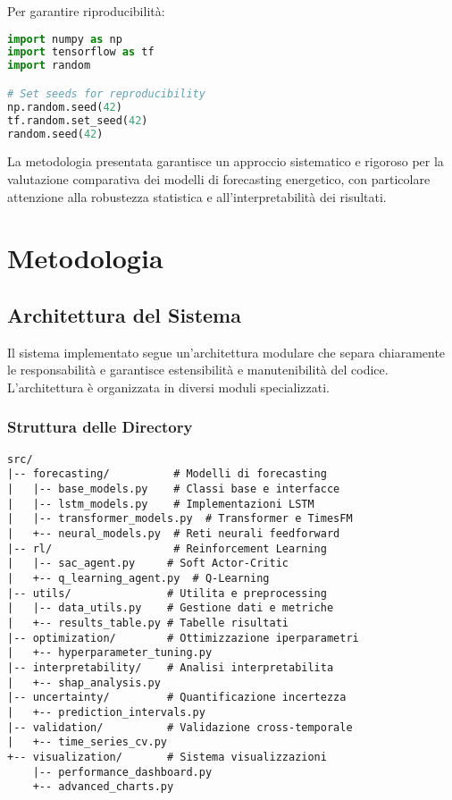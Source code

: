 \documentclass[12pt,a4paper,twoside]{report}
\begin{document}
Per garantire riproducibilità:

\begin{lstlisting}[language=Python]
import numpy as np
import tensorflow as tf
import random

# Set seeds for reproducibility
np.random.seed(42)
tf.random.set_seed(42)
random.seed(42)
\end{lstlisting}

La metodologia presentata garantisce un approccio sistematico e rigoroso per la valutazione comparativa dei modelli di forecasting energetico, con particolare attenzione alla robustezza statistica e all'interpretabilità dei risultati.


\chapter{Metodologia}

\section{Architettura del Sistema}

Il sistema implementato segue un'architettura modulare che separa chiaramente le responsabilità e garantisce estensibilità e manutenibilità del codice. L'architettura è organizzata in diversi moduli specializzati.

\subsection{Struttura delle Directory}

\begin{lstlisting}
src/
|-- forecasting/          # Modelli di forecasting
|   |-- base_models.py    # Classi base e interfacce
|   |-- lstm_models.py    # Implementazioni LSTM
|   |-- transformer_models.py  # Transformer e TimesFM
|   +-- neural_models.py  # Reti neurali feedforward
|-- rl/                   # Reinforcement Learning  
|   |-- sac_agent.py     # Soft Actor-Critic
|   +-- q_learning_agent.py  # Q-Learning
|-- utils/               # Utilita e preprocessing
|   |-- data_utils.py    # Gestione dati e metriche
|   +-- results_table.py # Tabelle risultati
|-- optimization/        # Ottimizzazione iperparametri
|   +-- hyperparameter_tuning.py
|-- interpretability/    # Analisi interpretabilita
|   +-- shap_analysis.py
|-- uncertainty/         # Quantificazione incertezza
|   +-- prediction_intervals.py
|-- validation/          # Validazione cross-temporale
|   +-- time_series_cv.py
+-- visualization/       # Sistema visualizzazioni
    |-- performance_dashboard.py
    +-- advanced_charts.py
\end{lstlisting}
\end{document}
